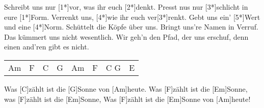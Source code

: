\begin{guitar}
	Schreibt uns nur [1*]vor, was ihr euch [2*]denkt.
	Presst nus nur [3*]schlicht in eure [1*]Form.
	Verrenkt uns, [4*]wie ihr euch ver[3*]renkt.
	Gebt uns ein' [5*]Wert und eine [4*]Norm.
	Schüttelt die Köpfe über uns.
	Bringt uns're Namen in Verruf.
	Das kümmert uns nicht wesentlich.
	Wir geh'n den Pfad, der uns erschuf, denn einen and'ren gibt es nicht.
	
	{\footnotesize\begin{tabular}{l|l|l|l|l|l|l|l}
			Am & F & C & G & Am & F & C G & E 
	\end{tabular}}
	
	Was [C]zählt ist die [G]Sonne von [Am]heute.
	Was [F]zählt ist die [Em]Sonne, was [F]zählt ist die [Em]Sonne, 
	Was [F]zählt ist die [Em]Sonne von [Am]heute!
	
\end{guitar}
